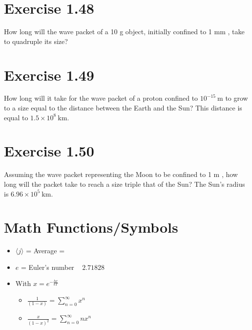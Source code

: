 \documentclass[10pt]{article}
\begin{document}
\section*{Exercise 1.48}
How long will the wave packet of a 10 g object, initially confined to 1 mm , take to quadruple its size?

\section*{Exercise 1.49}
How long will it take for the wave packet of a proton confined to $10^{-15} \mathrm{~m}$ to grow to a size equal to the distance between the Earth and the Sun? This distance is equal to $1.5 \times 10^{8} \mathrm{~km}$.

\section*{Exercise 1.50}
Assuming the wave packet representing the Moon to be confined to 1 m , how long will the packet take to reach a size triple that of the Sun? The Sun's radius is $6.96 \times 10^{5} \mathrm{~km}$.



\section{Math Functions/Symbols}
    \begin{itemize}
        \item $\langle j \rangle$ = Average = 
        \item $e$ = Euler's number ~ $2.71828$
        \item With $x = e^{- \frac{h \nu}{k T}}$
        \begin{itemize}
            \item $\frac{1}{(1-x)} = \sum_{n=0}^\infty x^n$
            \item $\frac{x}{(1-x)^2} = \sum_{n=0}^\infty nx^n$
        \end{itemize}
    \end{itemize}
\end{document}

